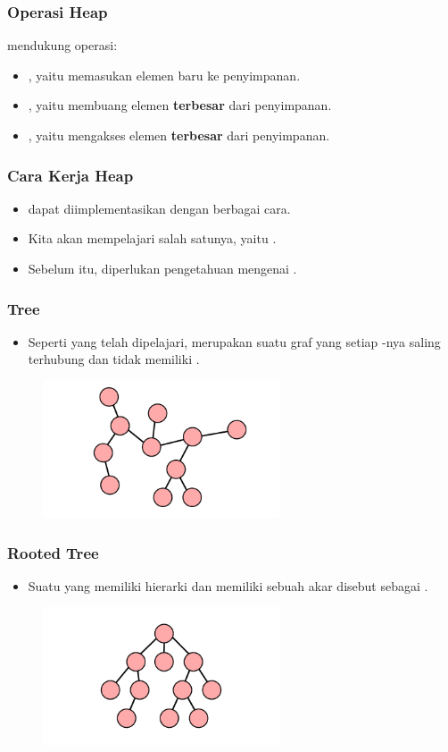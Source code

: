 \begin{frame}
\frametitle{Operasi Heap}
\pHeap mendukung operasi:
\begin{itemize}
  \item {}, yaitu memasukan elemen baru ke penyimpanan.
  \item {}, yaitu membuang elemen \textbf{terbesar} dari penyimpanan.
  \item {}, yaitu mengakses elemen \textbf{terbesar} dari penyimpanan. 
\end{itemize}
\end{frame}

\begin{frame}
\frametitle{Cara Kerja Heap}
\begin{itemize}
  \item \pHeap dapat diimplementasikan dengan berbagai cara.
  \item Kita akan mempelajari salah satunya, yaitu \pbinaryHeap.
  \item Sebelum itu, diperlukan pengetahuan mengenai \ftree.
\end{itemize}
\end{frame}

\begin{frame}
\frametitle{Tree}
\begin{itemize}
  \item Seperti yang telah dipelajari, \ftree merupakan suatu graf yang setiap \fnode-nya saling terhubung dan tidak memiliki .
\end{itemize}
\begin{figure}
  \includegraphics[width=7cm]{asset/tree.pdf}
\end{figure}
\end{frame}

\begin{frame}
\frametitle{Rooted Tree}
\begin{itemize}
  \item Suatu \ftree yang memiliki hierarki dan memiliki sebuah akar disebut sebagai .
\end{itemize}
\begin{figure}
  \includegraphics[width=7cm]{asset/rooted-tree.pdf}
\end{figure}
\end{frame}

